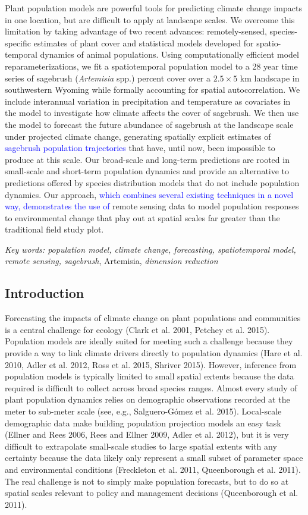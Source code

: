 \documentclass[12pt,]{article}
\begin{document}
Plant population models are powerful tools for predicting climate change
impacts in one location, but are difficult to apply at landscape scales.
We overcome this limitation by taking advantage of two recent advances:
remotely-sensed, species-specific estimates of plant cover and
statistical models developed for spatio-temporal dynamics of animal
populations. Using computationally efficient model reparameterizations,
we fit a spatiotemporal population model to a 28 year time series of
sagebrush (\emph{Artemisia} spp.) percent cover over a \(2.5\times5\) km
landscape in southwestern Wyoming while formally accounting for spatial
autocorrelation. We include interannual variation in precipitation and
temperature as covariates in the model to investigate how climate
affects the cover of sagebrush. We then use the model to forecast the
future abundance of sagebrush at the landscape scale under projected
climate change, generating spatially explicit estimates of
\textcolor{blue}{sagebrush population trajectories} that have, until
now, been impossible to produce at this scale. Our broad-scale and
long-term predictions are rooted in small-scale and short-term
population dynamics and provide an alternative to predictions offered by
species distribution models that do not include population dynamics. Our
approach,
\textcolor{blue}{which combines several existing techniques in a novel way, demonstrates the use of}
remote sensing data to model population responses to environmental
change that play out at spatial scales far greater than the traditional
field study plot.

\emph{Key words: population model, climate change, forecasting,
spatiotemporal model, remote sensing, sagebrush}, Artemisia,
\emph{dimension reduction}

\subsection{Introduction}\label{introduction}

Forecasting the impacts of climate change on plant populations and
communities is a central challenge for ecology (Clark et al. 2001,
Petchey et al. 2015). Population models are ideally suited for meeting
such a challenge because they provide a way to link climate drivers
directly to population dynamics (Hare et al. 2010, Adler et al. 2012,
Ross et al. 2015, Shriver 2015). However, inference from population
models is typically limited to small spatial extents because the data
required is difficult to collect across broad species ranges. Almost
every study of plant population dynamics relies on demographic
observations recorded at the meter to sub-meter scale (see, e.g.,
Salguero-Gómez et al. 2015). Local-scale demographic data make building
population projection models an easy task (Ellner and Rees 2006, Rees
and Ellner 2009, Adler et al. 2012), but it is very difficult to
extrapolate small-scale studies to large spatial extents with any
certainty because the data likely only represent a small subset of
parameter space and environmental conditions (Freckleton et al. 2011,
Queenborough et al. 2011). The real challenge is not to simply make
population forecasts, but to do so at spatial scales relevant to policy
and management decisions (Queenborough et al. 2011).
\end{document}
